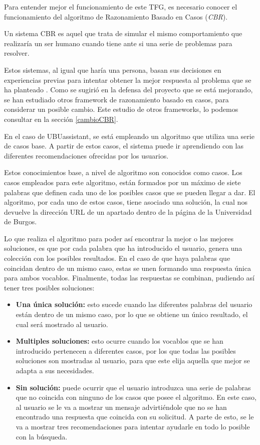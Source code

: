 
Para entender mejor el funcionamiento de este TFG, es necesario conocer el funcionamiento del algoritmo de Razonamiento Basado en Casos (\textit{CBR}).

Un sistema CBR es aquel que trata de simular el mismo comportamiento que realizaría un ser humano cuando tiene ante si una serie de problemas para resolver.

Estos sistemas, al igual que haría una persona, basan sus decisiones en experiencias previas para intentar obtener la mejor respuesta al problema que se ha planteado \cite{cbr:wiki}. Como se sugirió en la defensa del proyecto que se está mejorando, se han estudiado otros framework de razonamiento basado en casos, para considerar un posible cambio. Este estudio de otros frameworks, lo podemos consultar en la sección \ref{cambioCBR}.

En el caso de UBUassistant, se está empleando un algoritmo que utiliza una serie de casos base. A partir de estos casos, el sistema puede ir aprendiendo con las diferentes recomendaciones ofrecidas por los usuarios.

Estos conocimientos base, a nivel de algoritmo son conocidos como casos. Los casos empleados para este algoritmo, están formados por un máximo de siete palabras que definen cada uno de los posibles casos que se pueden llegar a dar. El algoritmo, por cada uno de estos casos, tiene asociado una solución, la cual nos devuelve la dirección URL de un apartado dentro de la página de la Universidad de Burgos.

Lo que realiza el algoritmo para poder así encontrar la mejor o las mejores soluciones, es que por cada palabra que ha introducido el usuario, genera una colección con los posibles resultados. En el caso de que haya palabras que coincidan dentro de un mismo caso, estas se unen formando una respuesta única para ambos vocablos. Finalmente, todas las respuestas se combinan, pudiendo así tener tres posibles soluciones:

\begin{itemize}
	\tightlist
	\item
	\textbf{Una única solución:} esto sucede cuando las diferentes palabras del usuario están dentro de un mismo caso, por lo que se obtiene un único resultado, el cual será mostrado al usuario.
	\item 
	\textbf{Multiples soluciones:} esto ocurre cuando los vocablos que se han introducido pertenecen a diferentes casos, por los que todas las posibles soluciones son mostradas al usuario, para que este elija aquella que mejor se adapta a sus necesidades.
	\item 
	\textbf{Sin solución:} puede ocurrir que el usuario introduzca una serie de palabras que no coincida con ninguno de los casos que posee el algoritmo. En este caso, al usuario se le va a mostrar un mensaje advirtiéndole que no se han encontrado una respuesta que coincida con su solicitud. A parte de esto, se le va a mostrar tres recomendaciones para intentar ayudarle en todo lo posible con la búsqueda.
\end{itemize}

